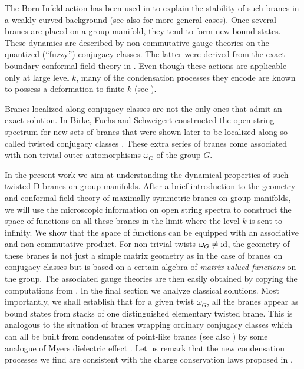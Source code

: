 \documentclass[12pt,a4paper]{article}
\def\id{{\rm id}}
\begin{document}
The Born-Infeld action has been used in \cite{Bachas:2000ik,
Pawelczyk:2000ah} to explain the stability of such branes in 
a weakly curved background (see also \cite{Bordalo:2001ec}
for more general cases). Once several branes are placed on 
a group manifold, they tend to form new bound states. These 
dynamics are described by non-commutative gauge theories on 
the quantized (``fuzzy'') conjugacy classes. The latter were 
derived from the exact boundary conformal field theory in 
\cite{Alekseev:1999bs}. Even though these actions are 
applicable only at large level $k$, many of the condensation 
processes they encode are known to possess a deformation to 
finite $k$ (see \cite{Alekseev:2000jx,Fredenhagen:2000ei}).     
\medskip
  
Branes localized along conjugacy classes are not the 
only ones that admit an exact solution. In \cite{Birke:1999ik} 
Birke, Fuchs and Schweigert constructed the open string 
spectrum for new sets of branes that were shown later 
to be localized along so-called twisted conjugacy 
classes \cite{Felder:1999ka}. These extra series of branes 
come associated with non-trivial outer automorphisms 
$\omega_G$ of the group $G$. 
\medskip

In the present work we aim at understanding the dynamical 
properties of such twisted D-branes on group manifolds.  
After a brief introduction to the geometry and conformal 
field theory of maximally symmetric branes on group 
manifolds, we will use the microscopic information on 
open string spectra to construct the space of functions 
on all these branes in the limit where the level $k$ is 
sent to infinity. We show that the space of functions 
can be equipped with an associative and non-commutative 
product. For non-trivial twists $\omega_G \neq \id$, the 
geometry of these branes is not just a simple matrix 
geometry as in the case of branes on conjugacy classes
but is based on a certain algebra of {\em matrix valued
functions} on the group.
The associated gauge theories are then easily obtained by 
copying the computations from \cite{Alekseev:1999bs}. In 
the final section we analyze classical solutions. Most 
importantly, we shall establish that for a given 
twist $\omega_G$, all the branes appear as bound 
states from stacks of one distinguished elementary 
twisted brane. This is analogous to the situation of branes 
wrapping ordinary conjugacy classes which can all be 
built from condensates of point-like branes 
\cite{Alekseev:2000fd} (see also \cite{Hashimoto:2001xy,
Hikida:2001py}) by some analogue of Myers dielectric 
effect \cite{Myers:1999ps}. Let us remark 
that the new condensation processes we find are  
consistent with the charge conservation laws  
proposed in \cite{Fredenhagen:2000ei}.  
\end{document}
